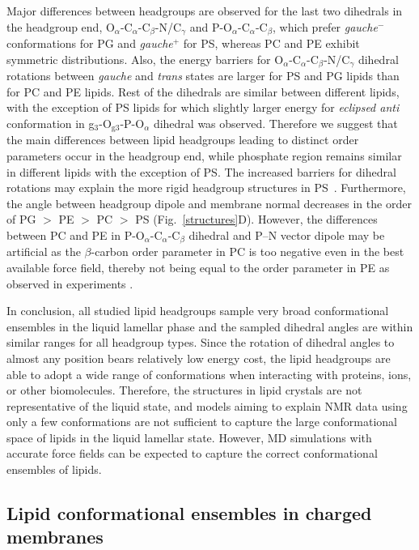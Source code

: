\documentclass[aps,prl,superscriptaddress,twocolumn]{revtex4}
\begin{document}
Major differences between headgroups are observed for the last two dihedrals in the headgroup end,
O$_\alpha$-C$_\alpha$-C$_\beta$-N/C$_\gamma$ and P-O$_\alpha$-C$_\alpha$-C$_\beta$,
which prefer \textit{gauche$^-$} conformations for PG and \textit{gauche$^+$} for PS,
whereas PC and PE exhibit symmetric distributions.
Also, the energy barriers for O$_\alpha$-C$_\alpha$-C$_\beta$-N/C$_\gamma$ dihedral
rotations between \textit{gauche} and \textit{trans} states are larger for
PS and PG lipids than for PC and PE lipids. 
Rest of the dihedrals are similar between different lipids,
with the exception of PS lipids for which slightly larger energy for \textit{eclipsed anti} conformation
in g$_3$-O$_{{\mathrm g}3}$-P-O$_\alpha$ dihedral was observed.
Therefore we suggest that the main differences between lipid headgroups leading to distinct order parameters occur in the headgroup end, while phosphate region remains similar in different lipids with the exception of PS. The increased barriers for dihedral rotations may explain the more rigid headgroup structures in PS~\cite{browning80,buldt81}. Furthermore, the angle between headgroup dipole and membrane normal decreases in the order of PG $>$ PE  $>$ PC  $>$ PS (Fig.~\ref{structures}D). However, the differences between PC and PE in P-O$_\alpha$-C$_\alpha$-C$_\beta$ dihedral
and P--N vector dipole may be artificial as the $\beta$-carbon order parameter in PC is too negative even in the best available force field, thereby not being equal to the order parameter in PE as observed in experiments \cite{botan15}.

In conclusion, all studied lipid headgroups sample very broad conformational ensembles in the liquid lamellar phase and the sampled dihedral angles are within similar ranges for all headgroup types.
Since the rotation of dihedral angles to almost any position bears relatively low energy cost, the lipid headgroups are able to adopt a wide range of conformations when interacting with proteins, ions, or other biomolecules.
Therefore, the structures in lipid crystals \cite{buldt81,pascher92} are not representative of the liquid state, and models aiming to explain NMR data using only a few conformations \cite{seelig77c,davis83,Semchyschyn04,akutsu20} are not sufficient to capture the large conformational space of lipids in the liquid lamellar state.
However, MD simulations with accurate force fields can be expected to capture the correct conformational ensembles of lipids.


\subsection{Lipid conformational ensembles in charged membranes}
\end{document}
